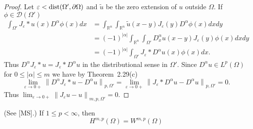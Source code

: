 \begin{proof}
  Let $\varepsilon<\operatorname{dist} (\Omega', \partial\Omega)$ 
  and $\tilde{u}$ be the zero extension of $u$ outside $\Omega$.
  If $\phi \in \mathscr{D}\left(\Omega'\right)$
  \[
  \begin{aligned}
    \int_{\Omega'} J_\varepsilon * u(x) D^\alpha \phi(x) d x
    & = \int_{\mathbb{R}^n} \int_{\mathbb{R}^n} \tilde{u}(x-y) J_\varepsilon(y) 
        D^\alpha \phi(x) d x d y \\
    & = (-1)^{|\alpha|} \int_{\mathbb{R}^n} \int_{\Omega'}
        D_x^\alpha u(x-y) J_\varepsilon(y) \phi(x) d x d y \\
    & = (-1)^{|\alpha|} \int_{\Omega'} J_\varepsilon * D^\alpha u(x) \phi(x) d x .
  \end{aligned}
  \]
  Thus $D^\alpha J_\varepsilon * u=J_\varepsilon * D^\alpha u$ in the distributional sense
  in $\Omega'$. Since $D^\alpha u \in L^p(\Omega)$ for $0 \leq|\alpha| \leq m$
  we have by Theorem~2.29(c)
  \[
  \lim _{\varepsilon \rightarrow 0+}\left\|D^\alpha J_\varepsilon * u-D^\alpha u\right\|_{p, \Omega'}=\lim _{\varepsilon \rightarrow 0+}\left\|J_\varepsilon * D^\alpha u-D^\alpha u\right\|_{p, \Omega'}=0 .
  \]
  Thus $\lim _{\varepsilon \rightarrow 0+}\left\|J_\varepsilon u-u\right\|_{m, p, \Omega'}=0$.
\end{proof}


\begin{theorem}[$\bm{H} = \bm{W}$]
  (See [MS].) If $1 \leq p<\infty$, then
  \[
  H^{m, p}(\Omega)=W^{m,p}(\Omega)
  \]
\end{theorem}

